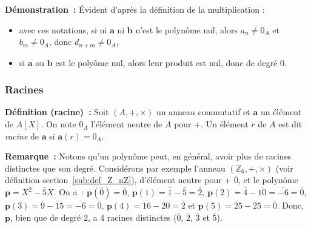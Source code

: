\medskip

\noindent\textbf{Démonstration :} Évident d'après la définition de la multiplication :
    \begin{itemize}
        \item avec ces notations, si ni $\mathbf{a}$ ni $\mathbf{b}$ n'est le polynôme nul, alors $a_n \neq 0_A$ et $b_m \neq 0_A$, donc $d_{n+m} \neq 0_A$, 
        \item si $\mathbf{a}$ ou $\mathbf{b}$ est le polyôme nul, alors leur produit est nul, donc de degré $0$.
    \end{itemize}

\subsubsection{Racines}

\noindent\textbf{Définition (racine) :} Soit $(A, +, \times)$ un anneau commutatif et $\mathbf{a}$ un élément de $A[X]$.
    On note $0_A$ l'élément neutre de $A$ pour $+$.
    Un élément $r$ de $A$ est dit \textit{racine} de $\mathbf{a}$ si $\mathbf{a}(r) = 0_A$.

\medskip

\noindent\textbf{Remarque :} Notons qu'un polynôme peut, en général, avoir plus de racines distinctes que son degré. 
    Considérons par exemple l'anneau $(\mathbb{Z}_6, +, \times)$ (voir définition section~\ref{sub:def_Z_nZ}), d'élément neutre pour $+$ $\bar{0}$, et le polynôme $\mathbf{p} = X^2 - \bar{5} X$. 
    On a : $\mathbf{p}(\bar{0}) = \bar{0}$, $\mathbf{p}(1) = \bar{1} - \bar{5} = \bar{2}$, $\mathbf{p}(2) = \bar{4} - \overline{10} = \overline{-6} = \bar{0}$, $\mathbf{p}(3) = \bar{9} - \overline{15} = \overline{-6} = \bar{0}$, $\mathbf{p}(4) = \overline{16} - \overline{20} = \bar{2}$ et $\mathbf{p}(5) = \overline{25} - \overline{25} = \bar{0}$. 
    Donc, $\mathbf{p}$, bien que de degré $2$, a $4$ racines distinctes ($\bar{0}$, $\bar{2}$, $\bar{3}$ et $\bar{5}$).

